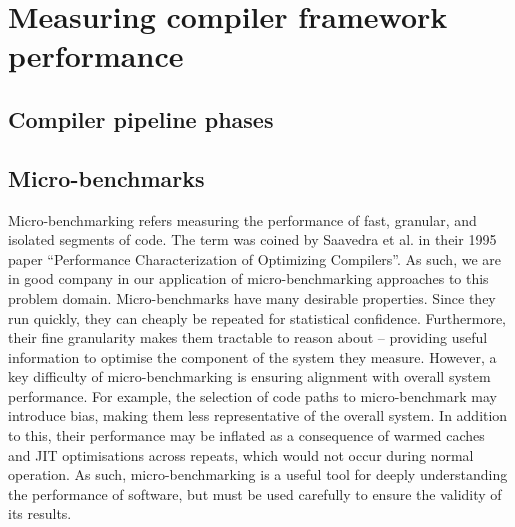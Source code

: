 
\chapter{Measuring compiler framework performance}
\label{chap:measuring-compiler-performance}



\section{Compiler pipeline phases}

\section{Micro-benchmarks}
\label{sec:ubenchmark}

Micro-benchmarking refers measuring the performance of fast, granular, and isolated segments of code.
The term was coined by Saavedra et al. in their 1995 paper \cite{saavedraPerformanceCharacterizationOptimizing1995} ``Performance Characterization of Optimizing Compilers''. As such, we are in good company in our application of micro-benchmarking approaches to this problem domain.
Micro-benchmarks have many desirable properties. Since they run quickly, they can cheaply be repeated for statistical confidence.
Furthermore, their fine granularity makes them tractable to reason about -- providing useful information to optimise the component of the system they measure.
However, a key difficulty of micro-benchmarking is ensuring alignment with overall system performance. For example, the selection of code paths to micro-benchmark may introduce bias, making them less representative of the overall system. In addition to this, their performance may be inflated as a consequence of warmed caches and JIT optimisations across repeats, which would not occur during normal operation.
As such, micro-benchmarking is a useful tool for deeply understanding the performance of software, but must be used carefully to ensure the validity of its results.

